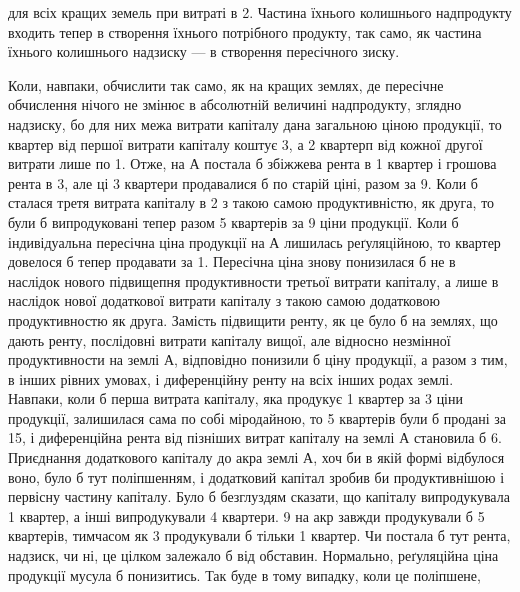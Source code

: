 \parcont{}  %
для всіх кращих земель при витраті в 2. Частина їхнього колишнього
надпродукту входить тепер в створення їхнього потрібного продукту, так
само, як частина їхнього колишнього надзиску — в створення пересічного зиску.

Коли, навпаки, обчислити так само, як на кращих землях, де пересічне обчислення
нічого не змінює в абсолютній величині надпродукту, зглядно надзиску, бо для
них межа витрати капіталу дана загальною ціною продукції, то квартер від першої
витрати капіталу коштує 3, а 2 квартерп від кожної другої витрати
лише по 1. Отже, на $А$ постала б збіжжева рента в 1 квартер
і грошова рента в 3, але ці 3 квартери продавалися б по старій
ціні, разом за 9. Коли б сталася третя витрата капіталу в 2 з такою самою продуктивністю, як друга, то були б випродуковані тепер
разом 5 квартерів за 9 ціни продукції. Коли б індивідуальна
пересічна ціна продукції на $А$ лишилась реґуляційною, то квартер довелося б
тепер продавати за 1. Пересічна ціна знову понизилася б не в
наслідок нового підвищепня продуктивности третьої витрати капіталу, а лише в
наслідок нової додаткової витрати капіталу з такою самою додатковою продуктивностю
як друга. Замість підвищити ренту, як це було б на землях, що дають
ренту, послідовні витрати капіталу вищої, але відносно незмінної продуктивности
на землі $А$, відповідно понизили б ціну продукції, а разом з тим, в інших
рівних умовах, і диференційну ренту на всіх інших родах землі. Навпаки,
коли б перша витрата капіталу, яка продукує 1 квартер за 3 ціни
продукції, залишилася сама по собі міродайною, то 5 квартерів були б продані
за 15, і диференційна рента від пізніших витрат капіталу на землі
$А$ становила б 6. Приєднання додаткового капіталу до акра землі $А$,
хоч би в якій формі відбулося воно, було б тут поліпшенням, і додатковий
капітал зробив би продуктивнішою і первісну частину капіталу. Було б безглуздям
сказати, що   капіталу випродукувала 1 квартер, а інші  випродукували
4 квартери. 9 на акр завжди продукували б 5 квартерів, тимчасом
як 3 продукували б тільки 1 квартер. Чи постала б тут рента, надзиск,
чи ні, це цілком залежало б від обставин. Нормально, реґуляційна ціна
продукції мусула б понизитись. Так буде в тому випадку, коли це поліпшене,

